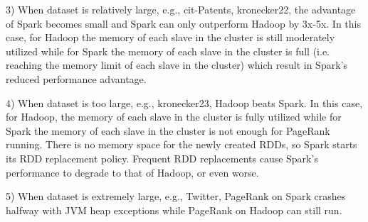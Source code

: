 \documentclass[10pt,conference,compsocconf]{IEEEtran}
\begin{document}
3) When dataset is relatively large, e.g., cit-Patents, kronecker22, the advantage of Spark becomes small and Spark can only outperform Hadoop by 3x-5x. In this case, for Hadoop the memory of each slave in the cluster is still moderately utilized while for Spark the memory of each slave in the cluster is full (i.e. reaching the memory limit of each slave in the cluster) which result in Spark's reduced performance advantage.

4) When dataset is too large, e.g., kronecker23, Hadoop beats Spark. In this case, for Hadoop, the memory of each slave in the cluster is fully utilized while for Spark the memory of each slave in the cluster is not enough for PageRank running. There is no memory space for the newly created RDDs, so Spark starts its RDD replacement policy. Frequent RDD replacements cause Spark's performance to degrade to that of Hadoop, or even worse.  

5) When dataset is extremely large, e.g., Twitter, PageRank on Spark crashes halfway with JVM heap exceptions while PageRank on Hadoop can still run.



\end{document}
